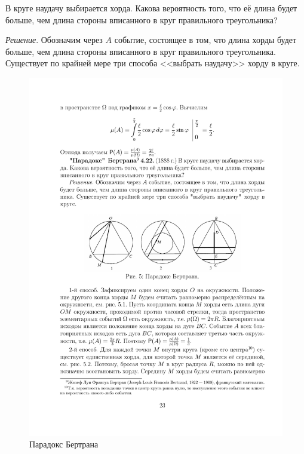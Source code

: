 \begin{example}
	
В круге наудачу выбирается хорда. Какова вероятность того, что её длина будет больше, чем длина стороны вписанного в круг правильного треугольника?

\textit{Решение}. Обозначим через $A$ событие, состоящее в том, что длина хорды будет больше, чем длина стороны вписанного в круг правильного треугольника. Существует по крайней мере три способа <<выбрать наудачу>> хорду в
круге.

\begin{figure}[H]
	\centering
	\includegraphics[]{pic/pic5}
	\caption{Парадокс Бертрана}
	\label{fig5}
\end{figure}


\end{example}
